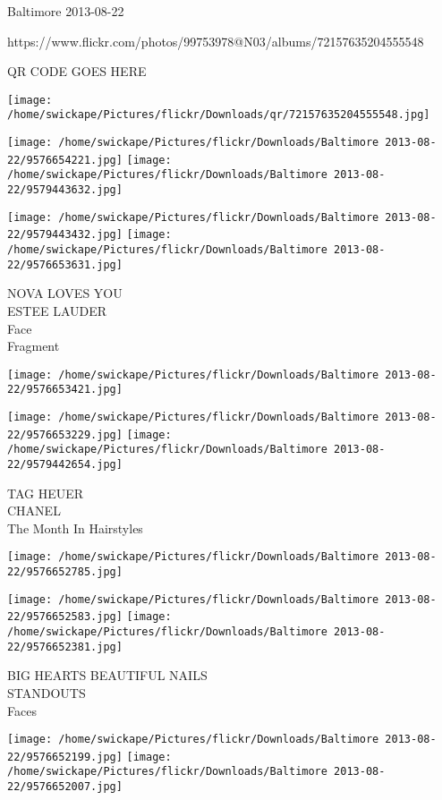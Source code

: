\documentclass[10pt,letterpaper]{article}
\begin{document}
Baltimore 2013-08-22

https://www.flickr.com/photos/99753978@N03/albums/72157635204555548

QR CODE GOES HERE

\texttt{[image: /home/swickape/Pictures/flickr/Downloads/qr/72157635204555548.jpg]}
\pagebreak

\texttt{[image: /home/swickape/Pictures/flickr/Downloads/Baltimore 2013-08-22/9576654221.jpg]}
\texttt{[image: /home/swickape/Pictures/flickr/Downloads/Baltimore 2013-08-22/9579443632.jpg]}

\texttt{[image: /home/swickape/Pictures/flickr/Downloads/Baltimore 2013-08-22/9579443432.jpg]}
\texttt{[image: /home/swickape/Pictures/flickr/Downloads/Baltimore 2013-08-22/9576653631.jpg]}

NOVA LOVES YOU\\
ESTEE LAUDER\\
Face\\
Fragment\\
\pagebreak

\texttt{[image: /home/swickape/Pictures/flickr/Downloads/Baltimore 2013-08-22/9576653421.jpg]}

\vspace{0.25in}
\texttt{[image: /home/swickape/Pictures/flickr/Downloads/Baltimore 2013-08-22/9576653229.jpg]}
\texttt{[image: /home/swickape/Pictures/flickr/Downloads/Baltimore 2013-08-22/9579442654.jpg]}

TAG HEUER\\
CHANEL\\
The Month In Hairstyles\\
\pagebreak

\texttt{[image: /home/swickape/Pictures/flickr/Downloads/Baltimore 2013-08-22/9576652785.jpg]}

\vspace{0.25in}
\texttt{[image: /home/swickape/Pictures/flickr/Downloads/Baltimore 2013-08-22/9576652583.jpg]}
\texttt{[image: /home/swickape/Pictures/flickr/Downloads/Baltimore 2013-08-22/9576652381.jpg]}

BIG HEARTS BEAUTIFUL NAILS\\
STANDOUTS\\
Faces\\
\pagebreak

\texttt{[image: /home/swickape/Pictures/flickr/Downloads/Baltimore 2013-08-22/9576652199.jpg]}
\texttt{[image: /home/swickape/Pictures/flickr/Downloads/Baltimore 2013-08-22/9576652007.jpg]}
\end{document}
